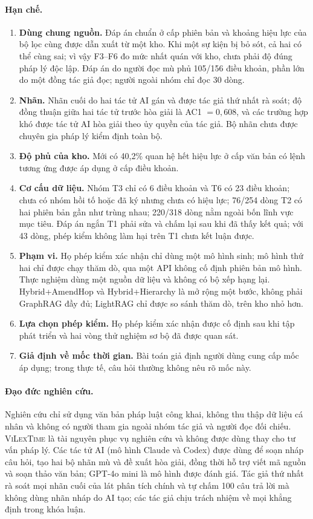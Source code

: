 \documentclass[11pt,a4paper]{article}
\newcommand{\sv}{\textsc{ViLexTime}}
\begin{document}
\paragraph{Hạn chế.}
\begin{enumerate}
  \item \textbf{Dùng chung nguồn.} Đáp án chuẩn ở cấp phiên bản và khoảng hiệu lực của bộ lọc cùng được dẫn xuất từ một kho. Khi một sự kiện bị bỏ sót, cả hai có thể cùng sai; vì vậy F3--F6 đo mức nhất quán với kho, chưa phải độ đúng pháp lý độc lập. Đáp án do người đọc mù phủ 105/156 điều khoản, phần lớn do một đồng tác giả đọc; người ngoài nhóm chỉ đọc 30 dòng.
  \item \textbf{Nhãn.} Nhãn cuối do hai tác tử AI gán và được tác giả thứ nhất rà soát; độ đồng thuận giữa hai tác tử trước hòa giải là AC1 $=0{,}608$, và các trường hợp khó được tác tử AI hòa giải theo ủy quyền của tác giả. Bộ nhãn chưa được chuyên gia pháp lý kiểm định toàn bộ.
  \item \textbf{Độ phủ của kho.} Mới có 40,2\% quan hệ hết hiệu lực ở cấp văn bản có lệnh tương ứng được áp dụng ở cấp điều khoản.
  \item \textbf{Cơ cấu dữ liệu.} Nhóm T3 chỉ có 6 điều khoản và T6 có 23 điều khoản; chưa có nhóm hồi tố hoặc đã ký nhưng chưa có hiệu lực; 76/254 dòng T2 có hai phiên bản gần như trùng nhau; 220/318 dòng nằm ngoài bốn lĩnh vực mục tiêu. Đáp án ngắn T1 phải sửa và chấm lại sau khi đã thấy kết quả; với 43 dòng, phép kiểm không làm hại trên T1 chưa kết luận được.
  \item \textbf{Phạm vi.} Họ phép kiểm xác nhận chỉ dùng một mô hình sinh; mô hình thứ hai chỉ được chạy thăm dò, qua một API không cố định phiên bản mô hình. Thực nghiệm dùng một nguồn dữ liệu và không có bộ xếp hạng lại. Hybrid+AmendHop và Hybrid+Hierarchy là mở rộng một bước, không phải GraphRAG đầy đủ; LightRAG chỉ được so sánh thăm dò, trên kho nhỏ hơn.
  \item \textbf{Lựa chọn phép kiểm.} Họ phép kiểm xác nhận được cố định sau khi tập phát triển và hai vòng thử nghiệm sơ bộ đã được quan sát.
  \item \textbf{Giả định về mốc thời gian.} Bài toán giả định người dùng cung cấp mốc áp dụng; trong thực tế, câu hỏi thường không nêu rõ mốc này.
\end{enumerate}

\paragraph{Đạo đức nghiên cứu.} Nghiên cứu chỉ sử dụng văn bản pháp luật công khai, không thu thập dữ liệu cá nhân và không có người tham gia ngoài nhóm tác giả và người đọc đối chiếu. \sv{} là tài nguyên phục vụ nghiên cứu và không được dùng thay cho tư vấn pháp lý. Các tác tử AI (mô hình Claude và Codex) được dùng để soạn nháp câu hỏi, tạo hai bộ nhãn mù và đề xuất hòa giải, đồng thời hỗ trợ viết mã nguồn và soạn thảo văn bản; GPT-4o mini là mô hình được đánh giá. Tác giả thứ nhất rà soát mọi nhãn cuối của lát phân tích chính và tự chấm 100 câu trả lời mà không dùng nhãn nháp do AI tạo; các tác giả chịu trách nhiệm về mọi khẳng định trong khóa luận.



\end{document}
